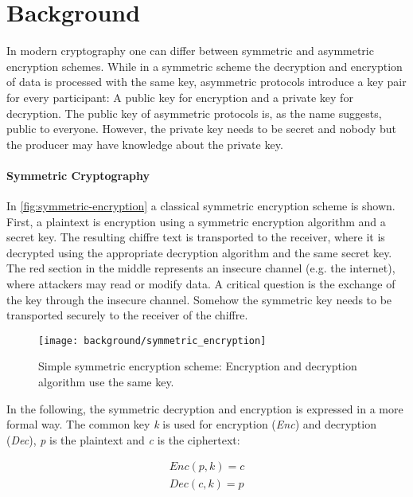 \chapter{Background}\label{chapter:background}

In modern cryptography one can differ between symmetric and asymmetric encryption schemes. While in a symmetric scheme the decryption and encryption of data is processed with the same key, asymmetric protocols introduce a key pair for every participant: A public key for encryption and a private key for decryption. The public key of asymmetric protocols is, as the name suggests, public to everyone. However, the private key needs to be secret and nobody but the producer may have knowledge about the private key.

\subsubsection{Symmetric Cryptography}

In \autoref{fig:symmetric-encryption} a classical symmetric encryption scheme is shown. First, a plaintext is encryption using a symmetric encryption algorithm and a secret key. The resulting chiffre text is transported to the receiver, where it is decrypted using the appropriate decryption algorithm and the same secret key.  The red section in the middle represents an insecure channel (e.g. the internet), where attackers may read or modify data. A critical question is the exchange of the key through the insecure channel. Somehow the symmetric key needs to be transported securely to the receiver of the chiffre.

\begin{figure}[htpb]
  \centering
  \texttt{[image: background/symmetric\_encryption]}
  \caption[Symmetric encryption scheme]{Simple symmetric encryption scheme: Encryption and decryption algorithm use the same key.} \label{fig:symmetric-encryption}
\end{figure}

In the following, the symmetric decryption and encryption is expressed in a more formal way. The common key \textit{k} is used for encryption (\textit{Enc}) and decryption (\textit{Dec}), \textit{p} is the plaintext and \textit{c} is the ciphertext:

\begin{align*}
Enc(p, k) = c\\
Dec(c, k) = p
\end{align*}

